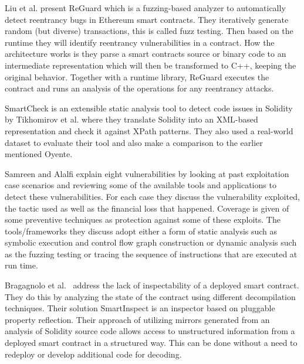 \documentclass[10pt,conference]{IEEEtran}
\begin{document}
Liu et al. \cite{reguard} present ReGuard which is a fuzzing-based analyzer to automatically detect reentrancy bugs in Ethereum smart contracts. They iteratively generate random (but diverse) transactions, this is called fuzz testing. Then based on the runtime they will identify reentrancy vulnerabilities in a contract. How the architecture works is they parse a smart contracts source or binary code to an intermediate representation which will then be transformed to C++, keeping the original behavior. Together with a runtime library, ReGuard executes the contract and runs an analysis of the operations for any reentrancy attacks.


SmartCheck is an extensible static analysis tool to detect code issues in Solidity by Tikhomirov et al.\cite{smartcheck} where they translate Solidity into an XML-based representation and check it against XPath patterns. They also used a real-world dataset to evaluate their tool and also make a comparison to the earlier mentioned Oyente.


Samreen and Alalfi \cite{survey} explain eight vulnerabilities by looking at past exploitation case scenarios and reviewing some of the available tools and applications to detect these vulnerabilities. For each case they discuss the vulnerability exploited, the tactic used as well as the financial loss that happened. Coverage is given of some preventive techniques as protection against some of these exploits. The tools/frameworks they discuss adopt either a form of static analysis such as symbolic execution and control flow graph construction or dynamic analysis such as the fuzzing testing or tracing the sequence of instructions that are executed at run time.


Bragagnolo et al.~\cite{rocha} address the lack of inspectability of a deployed smart contract. They do this by analyzing the state of the contract using different decompilation techniques. Their solution SmartInspect is an inspector based on pluggable property reflection. Their approach of utilizing mirrors generated from an analysis of Solidity source code allows access to unstructured information from a deployed smart contract in a structured way. This can be done without a need to redeploy or develop additional code for decoding.
\end{document}
